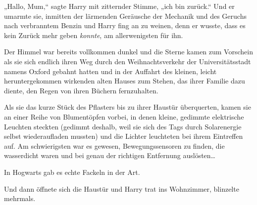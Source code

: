 „Hallo, Mum,“ sagte Harry mit zitternder Stimme, „ich bin zurück.“ Und er umarmte sie, inmitten der lärmenden Geräusche der Mechanik und des Geruchs nach verbranntem Benzin und Harry fing an zu weinen, denn er wusste, dass es kein Zurück mehr geben \emph{konnte}, am allerwenigsten für ihn.

\later

Der Himmel war bereits vollkommen dunkel und die Sterne kamen zum Vorschein als sie sich endlich ihren Weg durch den Weihnachtsverkehr der Universitätsstadt namens Oxford gebahnt hatten und in der Auffahrt des kleinen, leicht heruntergekommen wirkenden alten Hauses zum Stehen, das ihrer Familie dazu diente, den Regen von ihren Büchern fernzuhalten.

Als sie das kurze Stück des Pflasters bis zu ihrer Haustür überquerten, kamen sie an einer Reihe von Blumentöpfen vorbei, in denen kleine, gedimmte elektrische Leuchten steckten (gedimmt deshalb, weil sie sich des Tags durch Solarenergie selbst wiederaufladen mussten) und die Lichter leuchteten bei ihrem Eintreffen auf. Am schwierigsten war es gewesen, Bewegungssensoren zu finden, die wasserdicht waren und bei genau der richtigen Entfernung auslösten…

In Hogwarts gab es echte Fackeln in der Art.

Und dann öffnete sich die Haustür und Harry trat ins Wohnzimmer, blinzelte mehrmals.

